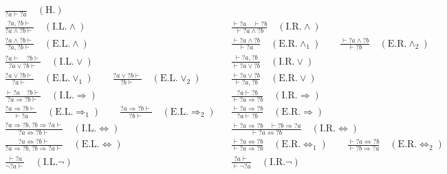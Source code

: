 \begin{figure}[hbt!]
  \begingroup
  \allowdisplaybreaks
  \begin{align*}
  \frac{}{{?a} \vdash {?a}} \quad (\text{H.}) && \\[1em]
  \frac{{?a}, {?b} \vdash}{{?a} \land {?b} \vdash} \quad (\text{I.L.} \land) && \frac{\vdash {?a} \quad \vdash {?b}}{\vdash {?a} \land {?b}} \quad (\text{I.R.} \land) \\[1em]
  \frac{{?a} \land {?b} \vdash}{{?a}, {?b} \vdash} \quad (\text{E.L.} \land) && \frac{\vdash {?a} \land {?b}}{\vdash {?a}} \quad (\text{E.R.} \land_1) \quad\quad \frac{\vdash {?a} \land {?b}}{\vdash {?b}} \quad (\text{E.R.} \land_2) \\[1em]
  \frac{{?a} \vdash \quad {?b} \vdash}{{?a} \lor {?b} \vdash} \quad (\text{I.L.} \lor) && \frac{\vdash {?a}, {?b}}{\vdash {?a} \lor {?b}} \quad (\text{I.R.} \lor) \\[1em]
  \frac{{?a} \lor {?b} \vdash}{{?a} \vdash} \quad (\text{E.L.} \lor_1) \quad\quad \frac{{?a} \lor {?b} \vdash}{{?b} \vdash} \quad (\text{E.L.} \lor_2) && \frac{\vdash {?a} \lor {?b}}{\vdash {?a}, {?b}} \quad (\text{E.R.} \lor) \\[1em]
  \frac{\vdash {?a} \quad {?b} \vdash}{{?a} \Rightarrow {?b} \vdash} \quad (\text{I.L.} \Rightarrow) && \frac{{?a} \vdash {?b}}{\vdash {?a} \Rightarrow {?b}} \quad (\text{I.R.} \Rightarrow) \\[1em]
  \frac{{?a} \Rightarrow {?b} \vdash}{\vdash {?a}} \quad (\text{E.L.} \Rightarrow_1) \quad\quad \frac{{?a} \Rightarrow {?b} \vdash}{{?b} \vdash} \quad (\text{E.L.} \Rightarrow_2) && \frac{\vdash {?a} \Rightarrow {?b}}{{?a} \vdash {?b}} \quad (\text{E.R.} \Rightarrow) \\[1em]
  \frac{{?a} \Rightarrow {?b}, {?b} \Rightarrow {?a} \vdash}{{?a} \Leftrightarrow {?b} \vdash} \quad (\text{I.L.} \Leftrightarrow) && \frac{\vdash {?a} \Rightarrow {?b} \quad \vdash {?b} \Rightarrow {?a}}{\vdash {?a} \Leftrightarrow {?b}} \quad (\text{I.R.} \Leftrightarrow) \\[1em]
  \frac{{?a} \Leftrightarrow {?b} \vdash}{{?a} \Rightarrow {?b}, {?b} \Rightarrow {?a} \vdash} \quad (\text{E.L.} \Leftrightarrow) && \frac{\vdash {?a} \Leftrightarrow {?b}}{\vdash {?a} \Rightarrow {?b}} \quad (\text{E.R.} \Leftrightarrow_1) \quad\quad \frac{\vdash {?a} \Leftrightarrow {?b}}{\vdash {?b} \Rightarrow {?a}} \quad (\text{E.R.} \Leftrightarrow_2) \\[1em]
  \frac{\vdash {?a}}{\neg {?a} \vdash} \quad (\text{I.L.} \neg) && \frac{{?a} \vdash}{\vdash \neg {?a}} \quad (\text{I.R.} \neg) \\[1em]

\end{align*}
\end{figure}
